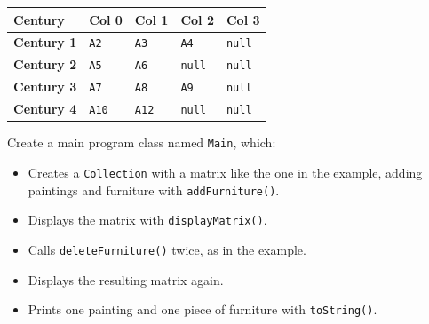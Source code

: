 \begin{center}
    \begin{tabular}{lllll}
        \hline
        Century & Col 0 & Col 1 & Col 2 & Col 3 \\
        \hline
        \textbf{Century 1} & \texttt{A2} & \texttt{A3} & \texttt{A4} & \texttt{null} \\
        \textbf{Century 2} & \texttt{A5} & \texttt{A6} & \texttt{null} & \texttt{null} \\
        \textbf{Century 3} & \texttt{A7} & \texttt{A8} & \texttt{A9} & \texttt{null} \\
        \textbf{Century 4} & \texttt{A10} & \texttt{A12} & \texttt{null} & \texttt{null} \\
        \hline
    \end{tabular}
\end{center}

Create a main program class named \texttt{Main}, which:

\begin{itemize}

    \item Creates a \texttt{Collection} with a matrix like the one in the example, adding paintings and furniture with \texttt{addFurniture()}.

    \item Displays the matrix with \texttt{displayMatrix()}.

    \item Calls \texttt{deleteFurniture()} twice, as in the example.

    \item Displays the resulting matrix again.

    \item Prints one painting and one piece of furniture with \texttt{toString()}.

\end{itemize}
